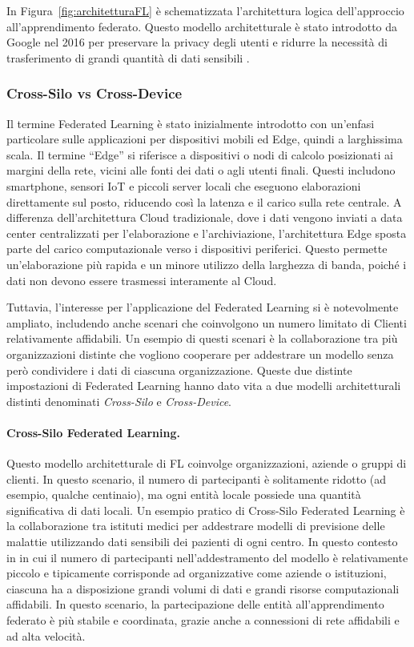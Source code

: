 \documentclass[a4paper, oneside, openright]{report}
\begin{document}
In Figura~\ref{fig:architetturaFL} è schematizzata l'architettura logica dell'approccio all'apprendimento federato. Questo modello architetturale è stato introdotto da Google nel 2016 per preservare la privacy degli utenti e ridurre la necessità di trasferimento di grandi quantità di dati sensibili \cite{DBLP:journals/corr/McMahanMRA16}.

\subsubsection*{Cross-Silo vs Cross-Device}

Il termine Federated Learning è stato inizialmente introdotto con un'enfasi particolare sulle applicazioni per dispositivi mobili ed Edge, quindi a larghissima scala. Il termine ``Edge'' si riferisce a dispositivi o nodi di calcolo posizionati ai margini della rete, vicini alle fonti dei dati o agli utenti finali. Questi includono smartphone, sensori IoT e piccoli server locali che eseguono elaborazioni direttamente sul posto, riducendo così la latenza e il carico sulla rete centrale. A differenza dell'architettura Cloud tradizionale, dove i dati vengono inviati a data center centralizzati per l'elaborazione e l'archiviazione, l'architettura Edge sposta parte del carico computazionale verso i dispositivi periferici. Questo permette un'elaborazione più rapida e un minore utilizzo della larghezza di banda, poiché i dati non devono essere trasmessi interamente al Cloud.


Tuttavia, l'interesse per l'applicazione del Federated Learning si è notevolmente ampliato, includendo anche scenari che coinvolgono un numero limitato di Clienti relativamente affidabili. Un esempio di questi scenari è la collaborazione tra più organizzazioni distinte che vogliono cooperare per addestrare un modello senza però condividere i dati di ciascuna organizzazione.
Queste due distinte impostazioni di Federated Learning hanno dato vita a due modelli architetturali distinti denominati  \textit{Cross-Silo} e \textit{Cross-Device}.

\paragraph{Cross-Silo Federated Learning.} Questo modello architetturale di FL coinvolge organizzazioni, aziende o gruppi di clienti. In questo scenario, il numero di partecipanti è solitamente ridotto (ad esempio, qualche centinaio), ma ogni entità locale possiede una quantità significativa di dati locali. Un esempio pratico di Cross-Silo Federated Learning è la collaborazione tra istituti medici per addestrare modelli di previsione delle malattie utilizzando dati sensibili dei pazienti di ogni centro. 
In questo contesto in in cui il numero di partecipanti nell'addestramento del modello è relativamente piccolo e tipicamente corrisponde ad organizzative come aziende o istituzioni, ciascuna ha a disposizione grandi volumi di dati e grandi risorse computazionali affidabili. In questo scenario, la partecipazione delle entità all'apprendimento federato è più stabile e coordinata, grazie anche a connessioni di rete affidabili e ad alta velocità.
\end{document}
